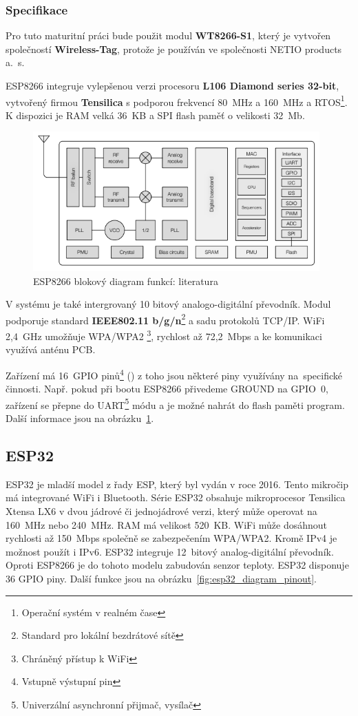 \documentclass[a4paper, 12pt]{report}
\begin{document}
    \subsubsection{Specifikace}
    Pro tuto maturitní práci bude použit modul \textbf{WT8266-S1}, který je vytvořen společností \textbf{Wireless-Tag}, protože je používán ve společnosti NETIO products a.~s.\par
    ESP8266 integruje vylepšenou verzi procesoru \textbf{L106 Diamond series 32-bit}, vytvořený firmou \textbf{Tensilica} s podporou frekvencí 80~\si{MHz} a 160~\si{MHz} a RTOS\footnote{Operační systém v realném čase}.
    K dispozici je RAM velká 36~\si{KB} a SPI flash paměť o velikosti 32~\si{Mb}.
    \begin{figure}[h!]
        \centering
        \includegraphics[width=11cm]{images/ESP8266_diagram}
        \caption{ESP8266 blokový diagram funkcí: literatura~\cite{ESP8266}}
        \label{fig:esp8266_diagram}
    \end{figure}

    V systému je také intergrovaný 10 bitový analogo-digitální převodník.
    Modul podporuje standard \textbf{IEEE802.11 b/g/n}\footnote{Standard pro lokální bezdrátové sítě} a sadu protokolů TCP/IP. WiFi 2,4~\si{GHz} umožňuje WPA/WPA2 \footnote{Chráněný přístup k WiFi}, rychlost až 72,2~\si{Mbps} a ke komunikaci využívá anténu PCB. \par
    Zařízení má 16~GPIO pinů\footnote{Vstupně výstupní pin} () z toho jsou některé piny využívány na~specifické činnosti.
    Např. pokud při bootu ESP8266 přivedeme GROUND na GPIO~0, zařízení se přepne do UART\footnote{Univerzální asynchronní přijmač, vysílač} módu a je možné nahrát do flash paměti program. Další informace jsou na obrázku~\ref{fig:esp8266_diagram}.


    \subsection{ESP32}
    ESP32 je mladší model z řady ESP, který byl vydán v roce 2016.
    Tento mikročip má integrované WiFi i Bluetooth.
    Série ESP32 obsahuje mikroprocesor Tensilica Xtensa LX6 v dvou jádrové či jednojádrové verzi, který může operovat na 160~\si{MHz} nebo 240~\si{MHz}.
    RAM má velikost 520~\si{KB}.
    WiFi může dosáhnout rychlosti až 150~\si{Mbps} společně se zabezpečením WPA/WPA2.
    Kromě IPv4 je možnost použít i IPv6.
    ESP32 integruje 12~bitový analog-digitální převodník.
    Oproti ESP8266 je do tohoto modelu zabudován senzor teploty.
    ESP32 disponuje 36 GPIO piny.
    Další funkce jsou na obrázku~\ref{fig:esp32_diagram_pinout}.
\end{document}
